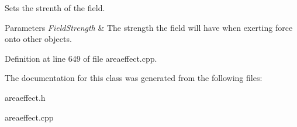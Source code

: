 Sets the strenth of the field. 


\begin{DoxyParams}{Parameters}
{\em FieldStrength} & The strength the field will have when exerting force onto other objects. \\
\hline
\end{DoxyParams}


Definition at line 649 of file areaeffect.cpp.



The documentation for this class was generated from the following files:\begin{DoxyCompactItemize}
\item 
areaeffect.h\item 
areaeffect.cpp\end{DoxyCompactItemize}
